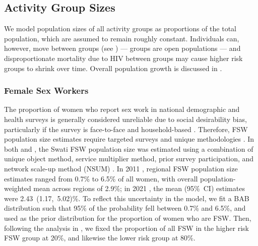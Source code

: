 \subsection{Activity Group Sizes}\label{mod.par.size}
We model population sizes of all activity groups as proportions of the total population,
which are assumed to remain roughly constant.
Individuals can, however, move between groups (see )
--- \ie groups are open populations ---
and disproportionate mortality due to HIV between groups
may cause higher risk groups to shrink over time.
Overall population growth is discussed in .
\subsubsection{Female Sex Workers}\label{mod.par.size.fsw}
The proportion of women who report sex work in national demographic and health surveys
is generally considered unreliable due to social desirability bias,
particularly if the survey is face-to-face and household-based
\cite{Konings1995,Gregson2002bias,Gregson2004,Lowndes2012,Behanzin2013}.
Therefore, FSW population size estimates require
targeted surveys and unique methodologies \cite{UNAIDS2010kps,Abdul-Quader2014}.
In both \cite{EswKP2014} and \cite{EswIBBS2022}, the Swati FSW population size
was estimated using a combination of
unique object method, service multiplier method, prior survey participation,
and network scale-up method (NSUM) \cite{UNAIDS2010kps}.
In 2011 \cite{EswKP2014}, regional FSW population size estimates
ranged from 0.7\% to 6.5\% of all women,
with overall population-weighted mean across regions of 2.9\%;
in 2021 \cite{EswIBBS2022}, the mean (95\%~CI) estimates were 2.43~(1.17,~5.02)\%.
To reflect this uncertainty in the model, we fit a BAB distribution
such that 95\% of the probability fell between 0.7\% and 6.5\%,
and used as the prior distribution for the proportion of women who are FSW.
Then, following the analysis in ,
we fixed the proportion of all FSW in the higher risk FSW group at 20\%,
and likewise the lower risk group at 80\%.
